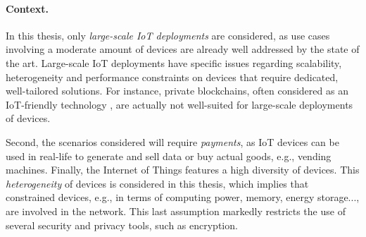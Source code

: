 
\paragraph{Context.} In this thesis, only \emph{large-scale IoT deployments} are considered, as use cases involving a moderate amount of devices are already well addressed by the state of the art. Large-scale IoT deployments have specific issues regarding scalability, heterogeneity and performance constraints on devices that require dedicated, well-tailored solutions. For instance, private blockchains, often considered as an IoT-friendly technology \cite{Asheralieva2021}, are actually not well-suited for large-scale deployments of devices. 

Second, the scenarios considered will require \emph{payments}, as IoT devices can be used in real-life to generate and sell data or buy actual goods, e.g., vending machines. Finally, the Internet of Things features a high diversity of devices. This \emph{heterogeneity} of devices is considered in this thesis, which implies that constrained devices, e.g., in terms of computing power, memory, energy storage..., are involved in the network. This last assumption markedly restricts the use of several security and privacy tools, such as encryption. 

